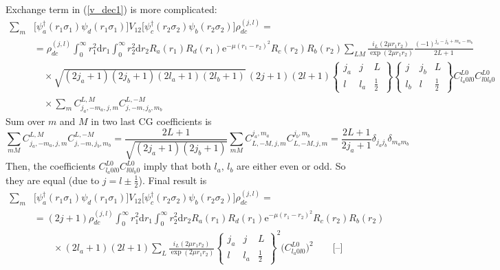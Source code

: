 \documentclass[10pt,a4paper]{article}
\begin{document}
Exchange term in (\ref{v_dec1}) is more complicated:
\begin{align}
\sum_m &\big[\psi_a^\dagger(r_1\sigma_1)\psi_d(r_1\sigma_1)\big]V_{12}
\big[\psi_c^\dagger(r_2\sigma_2)\psi_b(r_2\sigma_2)\big]\rho_{dc}^{(j,l)} =\nonumber\\
&= \rho_{dc}^{(j,l)} \int_0^\infty r_1^2\mathrm{d}r_1
\int_0^\infty r_2^2\mathrm{d}r_2 R_a(r_1) R_d(r_1)
\mathrm{e}^{-\mu(r_1-r_2)^2} R_c(r_2) R_b(r_2)
\sum_{LM}\frac{i_L(2\mu r_1 r_2)}{\exp(2\mu r_1 r_2)}
\frac{(-1)^{j_a-j_b+m_a-m_b}}{2L+1} \nonumber\\
&\quad\times \sqrt{(2j_a+1)(2j_b+1)(2l_a+1)(2l_b+1)}\,(2j+1)(2l+1)
\begin{Bmatrix} j_a & j & L \\ l & l_a & \frac{1}{2} \end{Bmatrix}
\begin{Bmatrix} j & j_b & L \\ l_b & l & \frac{1}{2} \end{Bmatrix}
C_{l_a 0 l 0}^{L0} C_{l 0 l_b 0}^{L0} \nonumber\\
&\quad\times \sum_m C_{j_a,-m_a,j,m}^{L,M} C_{j,-m,j_b,m_b}^{L,-M}
\end{align}
Sum over $m$ and $M$ in two last CG coefficients is
\begin{equation}
\sum_{mM} C_{j_a,-m_a,j,m}^{L,M} C_{j,-m,j_b,m_b}^{L,-M} = \frac{2L+1}{\sqrt{(2j_a+1)(2j_b+1)}}\sum_{mM} C_{L,-M,j,m}^{j_a,m_a} C_{L,-M,j,m}^{j_b,m_b}
= \frac{2L+1}{2j_a+1} \delta_{j_a j_b} \delta_{m_a m_b}
\end{equation}
Then, the coefficients $C_{l_a 0 l 0}^{L0} C_{l 0 l_b 0}^{L0}$ imply that both $l_a,\,l_b$ are either even or odd. So they are equal (due to $j=l\pm\tfrac{1}{2}$). Final result is
\begin{align}
\sum_m &\big[\psi_a^\dagger(r_1\sigma_1)\psi_d(r_1\sigma_1)\big]V_{12}
\big[\psi_c^\dagger(r_2\sigma_2)\psi_b(r_2\sigma_2)\big]\rho_{dc}^{(j,l)} =\nonumber\\
&= (2j+1)\rho_{dc}^{(j,l)} \int_0^\infty r_1^2\mathrm{d}r_1
\int_0^\infty r_2^2\mathrm{d}r_2 R_a(r_1) R_d(r_1)
\mathrm{e}^{-\mu(r_1-r_2)^2} R_c(r_2) R_b(r_2) \nonumber\\
&\qquad\times (2l_a+1)(2l+1)\sum_L \frac{i_L(2\mu r_1 r_2)}{\exp(2\mu r_1 r_2)}
\begin{Bmatrix} j_a & j & L \\ l & l_a & \frac{1}{2} \end{Bmatrix}^2
\Big(C_{l_a 0 l 0}^{L0}\Big)^2 \qquad \textbf{[--]}
\end{align}
\end{document}
